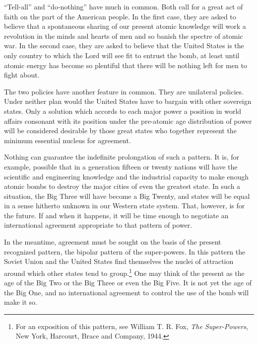 ``Tell-all'' and ``do-nothing'' have much in common. Both call for a great act of faith on the part of the American people. In the first case, they are asked to believe that a spontaneous sharing of our present atomic knowledge will work a revolution in the minds and hearts of men and so banish the spectre of atomic war. In the second case, they are asked to believe that the United States is the only country to which the Lord will see fit to entrust the bomb, at least until atomic energy has become so plentiful that there will be nothing left for men to fight about.

The two policies have another feature in common. They are unilateral policies. Under neither plan would the United States have to bargain with other sovereign states. Only a solution which accords to each major power a position in world affairs consonant with its position under the pre-atomic age distribution of power will be considered desirable by those great states who together represent the minimum essential nucleus for agreement.

Nothing can guarantee the indefinite prolongation of such a pattern. It is, for example, possible that in a generation fifteen or twenty nations will have the scientific and engineering knowledge and the industrial capacity to make enough atomic bombs to destroy the major cities of even the greatest state. In such a situation, the Big Three will have become a Big Twenty, and states will be equal in a sense hitherto unknown in our Western state system. That, however, is for the future. If and when it happens, it will be time enough to negotiate an international agreement appropriate to that pattern of power.

In the meantime, agreement must be sought on the basis of the present recognized pattern, the bipolar pattern of the super-powers. In this pattern the Soviet Union and the United States find themselves the nuclei of attraction around which other states tend to group.\footnote{For an exposition of this pattern, see William T. R. Fox, \textit{The Super-Powers}, New York, Harcourt, Brace and Company, 1944.} One may think of the present as the age of the Big Two or the Big Three or even the Big Five. It is not yet the age of the Big One, and no international agreement to control the use of the bomb will make it so.

